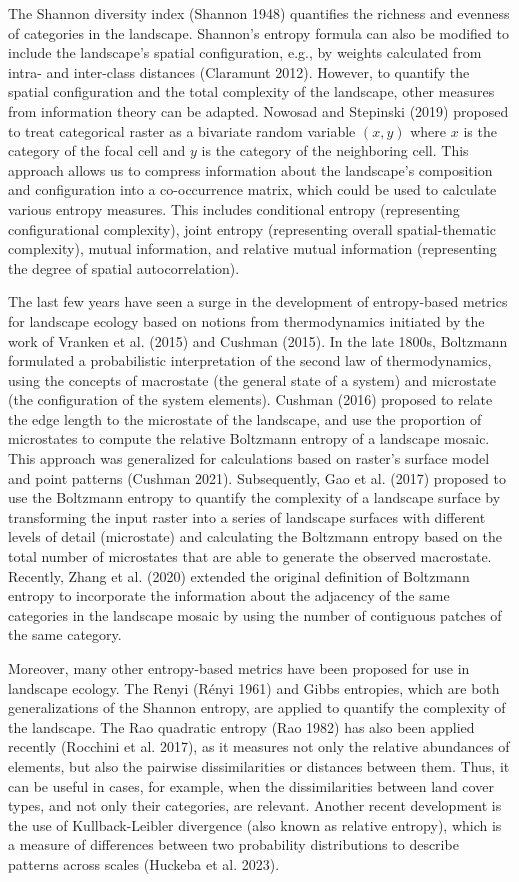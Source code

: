 \documentclass[
  12pt,
  a4paperpaper,
]{article}
\begin{document}
The Shannon diversity index (Shannon 1948) quantifies the richness and
evenness of categories in the landscape. Shannon's entropy formula can
also be modified to include the landscape's spatial configuration, e.g.,
by weights calculated from intra- and inter-class distances (Claramunt
2012). However, to quantify the spatial configuration and the total
complexity of the landscape, other measures from information theory can
be adapted. Nowosad and Stepinski (2019) proposed to treat categorical
raster as a bivariate random variable \((x,y)\) where \(x\) is the
category of the focal cell and \(y\) is the category of the neighboring
cell. This approach allows us to compress information about the
landscape's composition and configuration into a co-occurrence matrix,
which could be used to calculate various entropy measures. This includes
conditional entropy (representing configurational complexity), joint
entropy (representing overall spatial-thematic complexity), mutual
information, and relative mutual information (representing the degree of
spatial autocorrelation).

The last few years have seen a surge in the development of entropy-based
metrics for landscape ecology based on notions from thermodynamics
initiated by the work of Vranken et al. (2015) and Cushman (2015). In
the late 1800s, Boltzmann formulated a probabilistic interpretation of
the second law of thermodynamics, using the concepts of macrostate (the
general state of a system) and microstate (the configuration of the
system elements). Cushman (2016) proposed to relate the edge length to
the microstate of the landscape, and use the proportion of microstates
to compute the relative Boltzmann entropy of a landscape mosaic. This
approach was generalized for calculations based on raster's surface
model and point patterns (Cushman 2021). Subsequently, Gao et al. (2017)
proposed to use the Boltzmann entropy to quantify the complexity of a
landscape surface by transforming the input raster into a series of
landscape surfaces with different levels of detail (microstate) and
calculating the Boltzmann entropy based on the total number of
microstates that are able to generate the observed macrostate. Recently,
Zhang et al. (2020) extended the original definition of Boltzmann
entropy to incorporate the information about the adjacency of the same
categories in the landscape mosaic by using the number of contiguous
patches of the same category.

Moreover, many other entropy-based metrics have been proposed for use in
landscape ecology. The Renyi (Rényi 1961) and Gibbs entropies, which are
both generalizations of the Shannon entropy, are applied to quantify the
complexity of the landscape. The Rao quadratic entropy (Rao 1982) has
also been applied recently (Rocchini et al. 2017), as it measures not
only the relative abundances of elements, but also the pairwise
dissimilarities or distances between them. Thus, it can be useful in
cases, for example, when the dissimilarities between land cover types,
and not only their categories, are relevant. Another recent development
is the use of Kullback-Leibler divergence (also known as relative
entropy), which is a measure of differences between two probability
distributions to describe patterns across scales (Huckeba et al. 2023).
\end{document}
